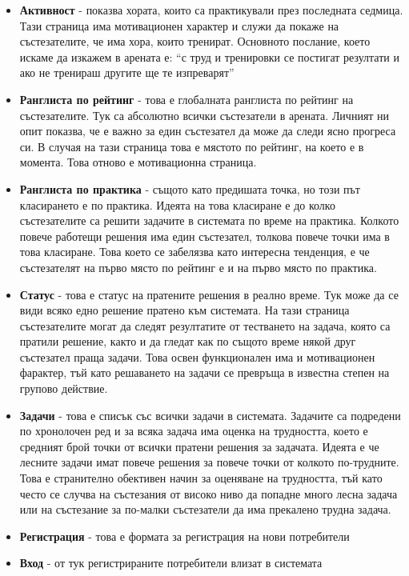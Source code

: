 \documentclass[a4paper,12pt]{article}
\begin{document}
  \begin{itemize}
    \item \textbf{Активност} - показва хората, които са практикували през последната седмица. Тази страница има мотивационен характер и служи да покаже на състезателите, че има хора, които тренират. Основното послание, което искаме да изкажем в арената е: ``с труд и тренировки се постигат резултати и ако не тренираш другите ще те изпреварят''
    \item \textbf{Ранглиста по рейтинг} - това е глобалната ранглиста по рейтинг на състезателите. Тук са абсолютно всички състезатели в арената. Личният ни опит показва, че е важно за един състезател да може да следи ясно прогреса си. В случая на тази страница това е мястото по рейтинг, на което е в момента. Това отново е мотивационна страница.
    \item \textbf{Ранглиста по практика} - същото като предишата точка, но този път класирането е по практика. Идеята на това класиране е до колко състезателите са решити задачите в системата по време на практика. Колкото повече работещи решения има един състезател, толкова повече точки има в това класиране. Това което се забелязва като интересна тенденция, е че състезателят на първо място по рейтинг е и на първо място по практика.
    \item \textbf{Статус} - това е статус на пратените решения в реално време. Тук може да се види всяко едно решение пратено към системата. На тази страница състезателите могат да следят резултатите от тестването на задача, която са пратили решение, както и да гледат как по същото време някой друг състезател праща задачи. Това освен функционален има и мотивационен фарактер, тъй като решаването на задачи се превръща в известна степен на групово действие.
    \item \textbf{Задачи} - това е списък със всички задачи в системата. Задачите са подредени по хронолочен ред и за всяка задача има оценка на трудността, което е средният брой точки от всички пратени решения за задачата. Идеята е че лесните задачи имат повече решения за повече точки от колкото по-трудните. Това е странително обективен начин за оценяване на трудността, тъй като често се случва на състезания от високо ниво да попадне много лесна задача или на състезание за по-малки състезатели да има прекалено трудна задача.
    \item \textbf{Регистрация} - това е формата за регистрация на нови потребители
    \item \textbf{Вход} - от тук регистрираните потребители влизат в системата
  \end{itemize}
\end{document}
